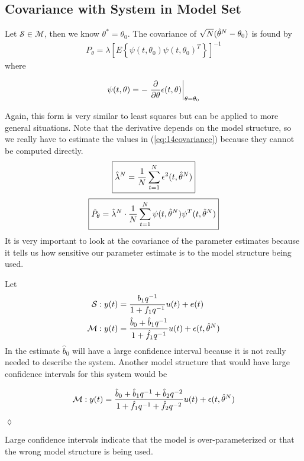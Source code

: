 \subsection{Covariance with System in Model Set}%
\label{sec:varsinm}
Let $\mathcal{S}\in\mathcal{M}$, then we know $\theta^\ast=\theta_0$.
The covariance of $\sqrt{N}(\hat{\theta}^N-\theta_0)$ is found by
\begin{align}
\label{eq:14covariance}
\boxed{P_\theta = \lambda{\left[E\left\lbrace \psi(t,\theta_0)\psi{(t,\theta_0)}^T\right\rbrace\right]}^{-1}}
\end{align}
where

\begin{equation*}
\psi(t,\theta) = -\left.\frac{\partial}{\partial\theta}\epsilon(t,\theta)\right|_{\theta=\theta_0}
\end{equation*}

Again, this form is very similar to least squares but can be applied to more general situations.
Note that the derivative depends on the model structure, so we really have to estimate the values in (\ref{eq:14covariance}) because they cannot be computed directly.
\begin{align*}
\boxed{\hat{\lambda}^N = \frac{1}{N}\sum_{t=1}^N\epsilon^2(t,\hat{\theta}^N)}
\end{align*}
\begin{align*}
\boxed{\hat{P}_\theta = \hat{\lambda}^N\cdot\frac{1}{N}\sum_{t=1}^N\psi(t,\hat{\theta}^N)\psi^T(t,\hat{\theta}^N)}
\end{align*}
It is very important to look at the covariance of the parameter estimates because it tells us how sensitive our parameter estimate is to the model structure being used.

\begin{example}
Let
\begin{align*}
\mathcal{S}: y(t) &= \frac{b_1q^{-1}}{1+f_1q^{-1}}u(t) + e(t) \\
\mathcal{M}: y(t) &= \frac{\hat{b}_0 + \hat{b}_1q^{-1}}{1+\hat{f}_1q^{-1}}u(t) + \epsilon(t,\hat{\theta}^N)
\end{align*}
In the estimate $\hat{b}_0$ will have a large confidence interval because it is not really needed to describe the system.
Another model structure that would have large confidence intervals for this system would be

\begin{equation*}
\mathcal{M}: y(t) = \frac{\hat{b}_0+\hat{b}_1q^{-1}+\hat{b}_2q^{-2}}{1+\hat{f}_1q^{-1}+\hat{f}_2q^{-2}}u(t)+\epsilon(t,\hat{\theta}^N)
\end{equation*}

$\lozenge$
\end{example}

Large confidence intervals indicate that the model is over-parameterized or that the wrong model structure is being used.

